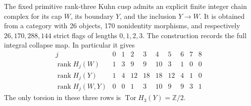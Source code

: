 \begin{theorem}\label{maps:src:F.2.34}


The fixed primitive rank-three Kuhn cusp admits an explicit
finite integer chain complex for its cap $W$, its boundary
$Y$, and the inclusion $Y\to W$.  It is obtained from a
category with 26 objects, 170 nonidentity morphisms, and
respectively $26,170,288,144$ strict flags of lengths
$0,1,2,3$.  The construction records the full integral
collapse map.  In particular it gives
\[
\begin{array}{c|rrrrrrrrr}
j&0&1&2&3&4&5&6&7&8\\\hline
\operatorname{rank}H_j(W)&1&3&9&9&10&3&1&0&0\\
\operatorname{rank}H_j(Y)&1&4&12&18&18&12&4&1&0\\
\operatorname{rank}H_j(W,Y)&0&0&1&3&10&9&9&3&1
\end{array}                                                \tag{F.CK1}\label{maps:eq:F.CK1}
\]
The only torsion in these three rows is
$\operatorname{Tor}H_3(Y)=\mathbb Z/2$.

\end{theorem}
